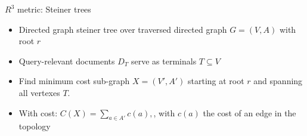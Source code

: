 
\begin{frame}{$R^{3}$ metric: Steiner trees}
    \begin{itemize}
        \item Directed graph steiner tree over traversed directed graph $G = (V, A)$ with root $r$
        \item Query-relevant documents $D_{T}$ serve as terminals $T \subseteq V$
        \item Find minimum cost sub-graph $X = (V', A')$ starting at root $r$ and spanning all vertexes $T$.
        \item With cost: $ C(X) = \sum\nolimits_{a \in A'} c(a), $, with $c(a)$ the cost of an edge in the topology
    \end{itemize}
\end{frame}
